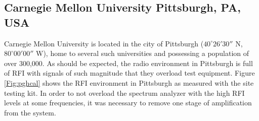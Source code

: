 \subsection{Carnegie Mellon University Pittsburgh, PA, USA}

Carnegie Mellon University is located in the city of Pittsburgh ($40^\circ 26'30''$ N, $80^\circ 00' 00''$ W), home to several such universities and possessing a population of over 300,000. As should be expected, the radio environment in Pittsburgh is full of RFI with signals of such magnitude that they overload test equipment. Figure \ref{Fig:pghcal} shows the RFI environment in Pittsburgh as measured with the site testing kit. In order to not overload the spectrum analyzer with the high RFI levels at some frequencies, it was necessary to remove one stage of amplification from the system. 


